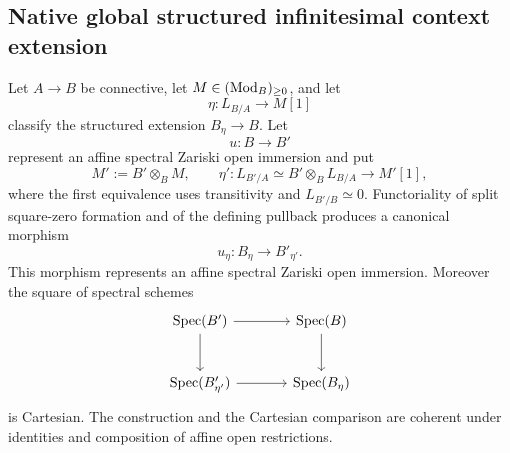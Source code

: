 \subsection{Native global structured infinitesimal context extension}

\begin{lemma}
\label{lem:square-zero-zariski-restriction}
Let \(A\to B\) be connective, let \(M\in(\operatorname{Mod}_B)_{\geq0}\), and let
\[
    \eta:L_{B/A}\longrightarrow M[1]
\]
classify the structured extension \(B_\eta\to B\). Let
\[
    u:B\longrightarrow B'
\]
represent an affine spectral Zariski open immersion and put
\[
    M':=B'\otimes_BM,
    \qquad
    \eta':L_{B'/A}\simeq B'\otimes_BL_{B/A}
        \longrightarrow M'[1],
\]
where the first equivalence uses transitivity and
\(L_{B'/B}\simeq0\). Functoriality of split square-zero formation and of the
defining pullback produces a canonical morphism
\[
    u_\eta:B_\eta\longrightarrow B'_{\eta'}.
\]
This morphism represents an affine spectral Zariski open immersion. Moreover
the square of spectral schemes
\[
\begin{tikzcd}[column sep=large,row sep=large]
    \Spec(B') \arrow[r] \arrow[d]
        & \Spec(B) \arrow[d]
    \\
    \Spec(B'_{\eta'}) \arrow[r]
        & \Spec(B_\eta)
\end{tikzcd}
\]
is Cartesian. The construction and the Cartesian comparison are coherent
under identities and composition of affine open restrictions.
\end{lemma}

